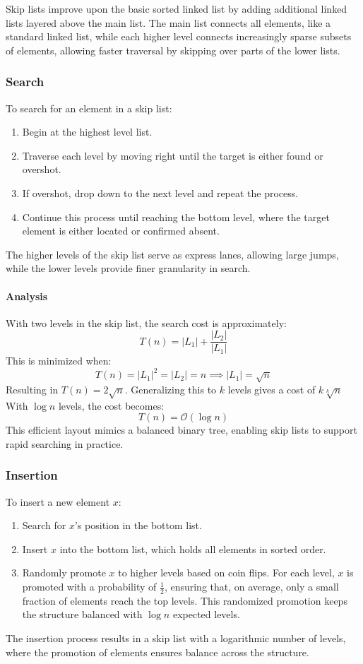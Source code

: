 Skip lists improve upon the basic sorted linked list by adding additional linked lists layered above the main list. 
The main list connects all elements, like a standard linked list, while each higher level connects increasingly sparse subsets of elements, allowing faster traversal by skipping over parts of the lower lists.

\subsubsection{Search}
To search for an element in a skip list:
\begin{enumerate} 
    \item Begin at the highest level list.
    \item Traverse each level by moving right until the target is either found or overshot.
    \item If overshot, drop down to the next level and repeat the process.
    \item Continue this process until reaching the bottom level, where the target element is either located or confirmed absent.
\end{enumerate} 
The higher levels of the skip list serve as express lanes, allowing large jumps, while the lower levels provide finer granularity in search.

\paragraph*{Analysis}
With two levels in the skip list, the search cost is approximately:
\[T(n)=\left\lvert L_1\right\rvert +\dfrac{\left\lvert L_2\right\rvert }{\left\lvert L_1\right\rvert }\]
This is minimized when:
\[T(n)=\left\lvert L_1\right\rvert ^2=\left\lvert L_2\right\rvert =n\implies \left\lvert L_1\right\rvert =\sqrt{n}\]
Resulting in $T(n)=2\sqrt{n}$. 
Generalizing this to $k$ levels gives a cost of $k\sqrt[k]{n}$
With $\log n$ levels, the cost becomes:
\[T(n)=\mathcal{O}(\log n)\]
This efficient layout mimics a balanced binary tree, enabling skip lists to support rapid searching in practice.

\subsubsection{Insertion}
To insert a new element $x$: 
\begin{enumerate}
    \item Search for $x$'s position in the bottom list.
    \item Insert $x$  into the bottom list, which holds all elements in sorted order.
    \item Randomly promote $x$ to higher levels based on coin flips.
        For each level, $x$ is promoted with a probability of $\frac{1}{2}$, ensuring that, on average, only a small fraction of elements reach the top levels.
        This randomized promotion keeps the structure balanced with $\log n$ expected levels.
\end{enumerate}
The insertion process results in a skip list with a logarithmic number of levels, where the promotion of elements ensures balance across the structure.

